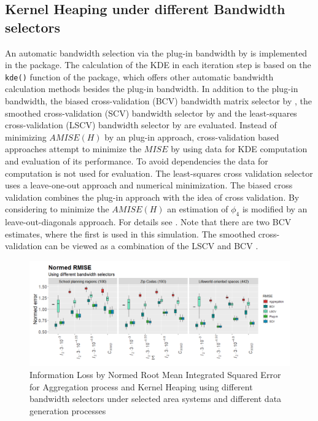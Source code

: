 \hypertarget{Kernel-Heaping-under-different-Bandwidth-selectors}{%
\subsection{Kernel Heaping under different Bandwidth selectors}\label{Kernel-Heaping-under-different-Bandwidth-selectors}}


An automatic bandwidth selection via the plug-in bandwidth by \cite{Wand94} is implemented in the \hyperlink{https://cran.r-project.org/web/packages/Kernelheaping/index.html}{} package. 
The calculation of the KDE in each iteration step is based on the \texttt{kde()} function of the \hyperlink{https://cran.r-project.org/web/packages/ks/index.html}{} package, which offers other automatic bandwidth calculation methods besides the plug-in bandwidth. 
In addition to the plug-in bandwidth, the biased cross-validation (BCV) bandwidth matrix selector by \cite{Sain1994}, the smoothed cross-validation (SCV) bandwidth selector by \cite{Duong2005} and the least-squares cross-validation (LSCV) bandwidth selector by \cite{Bowman} are evaluated.
Instead of minimizing $AMISE(H)$ by an plug-in approach, cross-validation based approaches attempt to minimize the $MISE$ by using data for KDE computation and evaluation of its performance. To avoid dependencies the data for computation is not used for evaluation. The least-squares cross validation selector uses a leave-one-out approach and numerical minimization. The biased cross validation combines the plug-in approach with the idea of cross validation. By considering to minimize the $AMISE(H)$ an estimation of $\phi_4$ is modified by an leave-out-diagonals approach. For details see \cite{Sain1994}. Note that there are two BCV estimates, where the first is used in this simulation.  
The smoothed cross-validation can be viewed as a combination of the LSCV and BCV
\cite{Duong2005}. \\
\begin{figure}[ht]
    \centering
    \includegraphics[width = \textwidth]{Figure/NormedRMISEBandwidth.png}
    \caption{Information Loss by Normed Root Mean Integrated Squared Error for Aggregation process and Kernel Heaping using different bandwidth selectors under selected area systems and different data generation processes }
    \label{fig:NormedRMISEBandwidth}
\end{figure}

